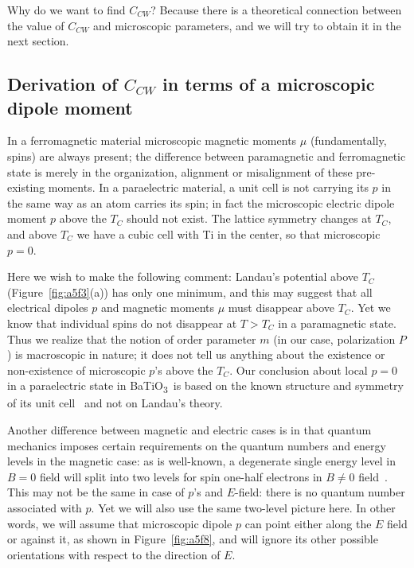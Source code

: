 \documentclass[11pt,a4paper]{article}
\newcommand{\BTO}{BaTiO\textsubscript{3}}
\begin{document}
Why do we want to find $C_{CW}$? Because there is a theoretical connection between
the value of $C_{CW}$ and microscopic parameters, and we will try to obtain it in the
next section.

\subsection{Derivation of \texorpdfstring{$C_{CW}$}{C-CW} in terms of a microscopic
            dipole moment}\label{sec:ccw}

In a ferromagnetic material microscopic magnetic moments $\mu$ (fundamentally,
spins) are always present; the difference between paramagnetic and ferromagnetic
state is merely in the organization, alignment or misalignment of these pre-existing
moments. In a paraelectric material, a unit cell is not carrying its $p$ in the same
way as an atom carries its spin; in fact the microscopic electric dipole moment $p$
above the $T_C$ should not exist. The lattice symmetry changes at $T_C$, and above
$T_C$ we have a cubic cell with Ti in the center, so that microscopic $p = 0$.

Here we wish to make the following comment: Landau's potential above $T_C$
(Figure~\ref{fig:a5f3}(a)) has only one minimum, and this may suggest that all
electrical dipoles $p$ and magnetic moments $\mu$ must disappear above $T_C$. Yet we
know that individual spins do not disappear at $T > T_C$ in a paramagnetic state.
Thus we realize that the notion of order parameter $m$ (in our case, polarization
$P$) is macroscopic in nature; it does not tell us anything about the existence or
non-existence of microscopic $p$'s above the $T_C$. Our conclusion about
local $p = 0$ in a paraelectric state in \BTO\ is based on the known structure and
symmetry of its unit cell~\cite{ref:jona,ref:blakemore} and not on Landau's theory.

Another difference between magnetic and electric cases is in that quantum mechanics
imposes certain requirements on the quantum numbers and energy levels in the magnetic
case: as is well-known, a degenerate single energy level in $B = 0$ field will split
into two levels for spin one-half electrons in $B \ne 0$
field~\cite{ref:papon,ref:landau1}. This may not be the same in case of $p$'s and
$E$-field: there is no quantum number associated with $p$. Yet we will also use the
same two-level picture here. In other words, we will assume that microscopic dipole
$p$ can point either along the $E$ field or against it, as shown in
Figure~\ref{fig:a5f8}, and will ignore its other possible orientations with respect
to the direction of $E$.
\end{document}
